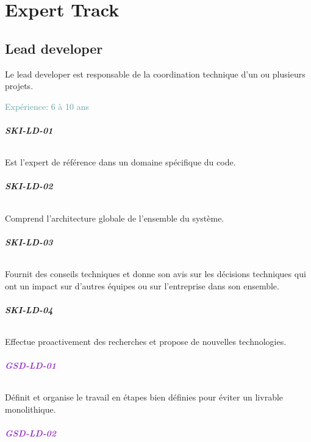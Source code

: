 \documentclass[a4paper, french, openany, 12pt]{book}
\newcommand\dex[1]{\textcolor{BrickRed}{\textbf{\uppercase{ski-{#1}}}}}
\newcommand\str[1]{\textcolor{DarkOrchid}{\textbf{\uppercase{gsd-{#1}}}}}
\newcommand\xp[1]{\textcolor{CadetBlue}{Expérience: {#1} ans}}
\begin{document}
\part{Expert Track}

\chapter{Lead developer}

Le lead developer est responsable de la coordination technique d'un ou plusieurs projets.

\xp{6 à 10}

\begin{multicols}{2}

  \paragraph*{\dex{ld-01}}

  Est l'expert de référence dans un domaine spécifique du code.

  \paragraph*{\dex{ld-02}}

  Comprend l'architecture globale de l'ensemble du système.

  \paragraph*{\dex{ld-03}}

  Fournit des conseils techniques et donne son avis sur les décisions techniques qui ont un impact sur d'autres équipes ou
  sur l'entreprise dans son ensemble.

  \paragraph*{\dex{ld-04}}

  Effectue proactivement des recherches et propose de nouvelles technologies.

  \paragraph*{\str{ld-01}}

  Définit et organise le travail en étapes bien définies pour éviter un livrable monolithique.

  \paragraph*{\str{ld-02}}


\end{multicols}
\end{document}
